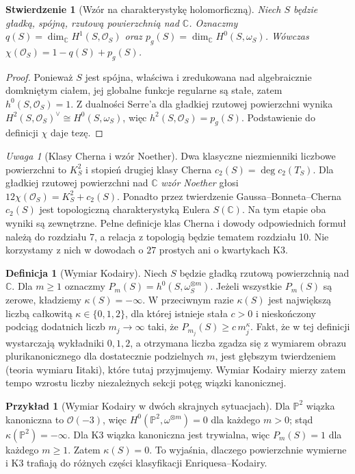 \documentclass[11pt,a4paper,openany]{report}
\numberwithin{equation}{section}
\theoremstyle{plain}
\newtheorem{stwierdzenie}[twierdzenie]{Stwierdzenie}
\theoremstyle{definition}
\newtheorem{definicja}[twierdzenie]{Definicja}
\newtheorem{przyklad}[twierdzenie]{Przykład}
\theoremstyle{remark}
\newtheorem{uwaga}[twierdzenie]{Uwaga}
\newcommand{\C}{\mathbb C}
\newcommand{\PP}{\mathbb P}
\begin{document}
\begin{stwierdzenie}[Wzór na charakterystykę holomorficzną]
\label{st:ga6-chi}
Niech $S$ będzie gładką, spójną, rzutową powierzchnią
nad $\C$. Oznaczmy $q(S)=\dim_\C H^1(S,\mathcal O_S)$
oraz $p_g(S)=\dim_\C H^0(S,\omega_S)$.
Wówczas $\chi(\mathcal O_S)=1-q(S)+p_g(S)$.
\end{stwierdzenie}
\begin{proof}
Ponieważ $S$ jest spójna, właściwa i zredukowana
nad algebraicznie domkniętym ciałem, jej globalne
funkcje regularne są stałe, zatem
$h^0(S,\mathcal O_S)=1$. Z dualności Serre'a
dla gładkiej rzutowej powierzchni wynika
$H^2(S,\mathcal O_S)^\vee\cong H^0(S,\omega_S)$,
więc $h^2(S,\mathcal O_S)=p_g(S)$.
Podstawienie do definicji $\chi$ daje tezę.
\end{proof}

\begin{uwaga}[Klasy Cherna i wzór Noether]
Dwa klasyczne niezmienniki liczbowe powierzchni
to $K_S^2$ i stopień drugiej klasy Cherna
$c_2(S)=\deg c_2(T_S)$. Dla gładkiej rzutowej
powierzchni nad $\C$ \emph{wzór Noether} głosi
$12\chi(\mathcal O_S)=K_S^2+c_2(S)$.
Ponadto przez twierdzenie Gaussa--Bonneta--Cherna
$c_2(S)$ jest topologiczną charakterystyką Eulera
$S(\C)$. Na tym etapie oba wyniki są zewnętrzne.
Pełne definicje klas Cherna i dowody odpowiednich
formuł należą do rozdziału 7, a relacja z topologią
będzie tematem rozdziału 10. Nie korzystamy z nich
w dowodach o $27$ prostych ani o kwartykach K3.
\end{uwaga}

\begin{definicja}[Wymiar Kodairy]
Niech $S$ będzie gładką rzutową powierzchnią nad $\C$.
Dla $m\ge1$ oznaczmy
$P_m(S)=h^0(S,\omega_S^{\otimes m})$.
Jeżeli wszystkie $P_m(S)$ są zerowe, kładziemy
$\kappa(S)=-\infty$. W przeciwnym razie
$\kappa(S)$ jest największą liczbą całkowitą
$\kappa\in\{0,1,2\}$, dla której istnieje stała
$c>0$ i nieskończony podciąg dodatnich liczb
$m_j\to\infty$ taki, że
$P_{m_j}(S)\ge c\,m_j^{\kappa}$.
Fakt, że w tej definicji wystarczają wykładniki
$0,1,2$, a otrzymana liczba zgadza się z wymiarem obrazu
plurikanonicznego dla dostatecznie podzielnych $m$,
jest głębszym twierdzeniem (teoria wymiaru Iitaki),
które tutaj przyjmujemy.
Wymiar Kodairy mierzy zatem tempo wzrostu
liczby niezależnych sekcji potęg wiązki kanonicznej.
\end{definicja}

\begin{przyklad}[Wymiar Kodairy w dwóch skrajnych sytuacjach]
Dla $\PP^2$ wiązka kanoniczna to $\mathcal O(-3)$,
więc $H^0(\PP^2,\omega^{\otimes m})=0$
dla każdego $m>0$; stąd $\kappa(\PP^2)=-\infty$.
Dla K3 wiązka kanoniczna jest trywialna,
więc $P_m(S)=1$ dla każdego $m\ge1$.
Zatem $\kappa(S)=0$. To wyjaśnia, dlaczego
powierzchnie wymierne i K3 trafiają do różnych
części klasyfikacji Enriquesa--Kodairy.
\end{przyklad}
\end{document}
